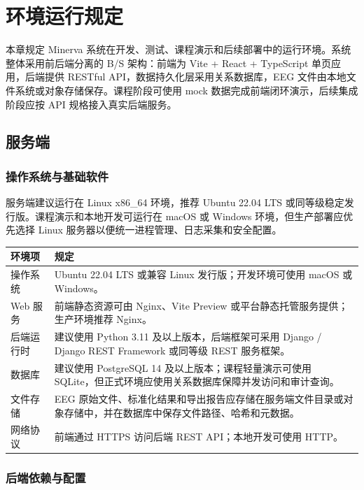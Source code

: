 \section{环境运行规定}

本章规定 Minerva 系统在开发、测试、课程演示和后续部署中的运行环境。系统整体采用前后端分离的 B/S 架构：前端为 Vite + React + TypeScript 单页应用，后端提供 RESTful API，数据持久化层采用关系数据库，EEG 文件由本地文件系统或对象存储保存。课程阶段可使用 mock 数据完成前端闭环演示，后续集成阶段应按 API 规格接入真实后端服务。

\subsection{服务端}

\subsubsection{操作系统与基础软件}

服务端建议运行在 Linux x86\_64 环境，推荐 Ubuntu 22.04 LTS 或同等级稳定发行版。课程演示和本地开发可运行在 macOS 或 Windows 环境，但生产部署应优先选择 Linux 服务器以便统一进程管理、日志采集和安全配置。

\begin{longtable}{|p{34mm}|p{88mm}|}
\hline
\textbf{环境项} & \textbf{规定} \\
\hline
操作系统 & Ubuntu 22.04 LTS 或兼容 Linux 发行版；开发环境可使用 macOS 或 Windows。 \\
\hline
Web 服务 & 前端静态资源可由 Nginx、Vite Preview 或平台静态托管服务提供；生产环境推荐 Nginx。 \\
\hline
后端运行时 & 建议使用 Python 3.11 及以上版本，后端框架可采用 Django / Django REST Framework 或同等级 REST 服务框架。 \\
\hline
数据库 & 建议使用 PostgreSQL 14 及以上版本；课程轻量演示可使用 SQLite，但正式环境应使用关系数据库保障并发访问和审计查询。 \\
\hline
文件存储 & EEG 原始文件、标准化结果和导出报告应存储在服务端文件目录或对象存储中，并在数据库中保存文件路径、哈希和元数据。 \\
\hline
网络协议 & 前端通过 HTTPS 访问后端 REST API；本地开发可使用 HTTP。 \\
\hline
\end{longtable}

\subsubsection{后端依赖与配置}

